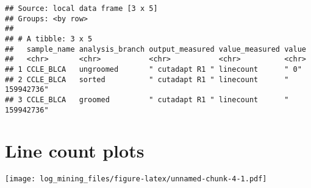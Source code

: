\documentclass[]{article}
\newenvironment{Shaded}{\begin{snugshade}}{\end{snugshade}}
\newcommand{\DataTypeTok}[1]{\textcolor[rgb]{0.13,0.29,0.53}{#1}}
\newcommand{\DecValTok}[1]{\textcolor[rgb]{0.00,0.00,0.81}{#1}}
\newcommand{\KeywordTok}[1]{\textcolor[rgb]{0.13,0.29,0.53}{\textbf{#1}}}
\newcommand{\NormalTok}[1]{#1}
\newcommand{\OperatorTok}[1]{\textcolor[rgb]{0.81,0.36,0.00}{\textbf{#1}}}
\newcommand{\StringTok}[1]{\textcolor[rgb]{0.31,0.60,0.02}{#1}}
\begin{document}
\begin{verbatim}
## Source: local data frame [3 x 5]
## Groups: <by row>
## 
## # A tibble: 3 x 5
##   sample_name analysis_branch output_measured value_measured value       
##   <chr>       <chr>           <chr>           <chr>          <chr>       
## 1 CCLE_BLCA   ungroomed       " cutadapt R1 " linecount      " 0"        
## 2 CCLE_BLCA   sorted          " cutadapt R1 " linecount      " 159942736"
## 3 CCLE_BLCA   groomed         " cutadapt R1 " linecount      " 159942736"
\end{verbatim}

\hypertarget{line-count-plots}{%
\section{Line count plots}\label{line-count-plots}}

\begin{Shaded}
\end{Shaded}

\texttt{[image: log\_mining\_files/figure-latex/unnamed-chunk-4-1.pdf]}
\end{document}

